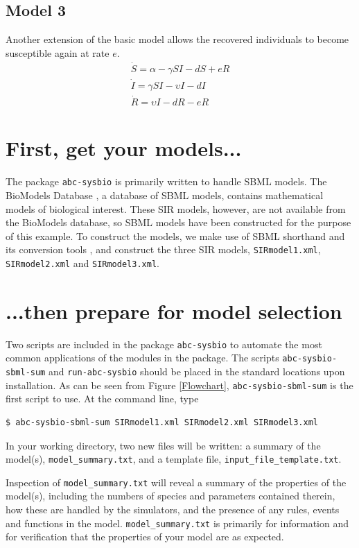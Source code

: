 \documentclass[a4paper]{report}
\begin{document}
\subsection*{Model 3}
Another extension of the basic model allows the recovered individuals to become susceptible again at rate $e$.
\begin{gather*}
\dot S = \alpha - \gamma SI - dS + eR\\
\dot I = \gamma SI - \upsilon I - dI \\
\dot R = \upsilon I - dR - eR
\end{gather*}

\section*{First, get your models...}
The package \verb$abc-sysbio$ is primarily written to handle SBML models. The BioModels Database \citep{LeNovere2006}, a database of SBML models, contains mathematical models of biological interest. These SIR models, however, are not available from the BioModels database, so SBML models have been constructed for the purpose of this example. To construct the models, we make use of SBML shorthand and its conversion tools \citep{Gillespie2006}, and construct the three SIR models, \verb$SIRmodel1.xml$, \verb$SIRmodel2.xml$ and \verb$SIRmodel3.xml$.

\section*{...then prepare for model selection}
Two scripts are included in the package \verb$abc-sysbio$ to automate the most common applications of the modules in the package. The scripts \verb$abc-sysbio-sbml-sum$ and \verb$run-abc-sysbio$ should be placed in the standard locations upon installation. As can be seen from Figure \ref{Flowchart}, \verb$abc-sysbio-sbml-sum$ is the first script to use. At the command line, type
\begin{verbatim}
$ abc-sysbio-sbml-sum SIRmodel1.xml SIRmodel2.xml SIRmodel3.xml
\end{verbatim}
In your working directory, two new files will be written: a summary of the model(s), \verb$model_summary.txt$, and a template file, \verb$input_file_template.txt$. 

Inspection of \verb$model_summary.txt$ will reveal a summary of the properties of the model(s), including the numbers of species and parameters contained therein, how these are handled by the simulators, and the presence of any rules, events and functions in the model. \verb$model_summary.txt$ is primarily for information and for verification that the properties of your model are as expected. 
\end{document}
